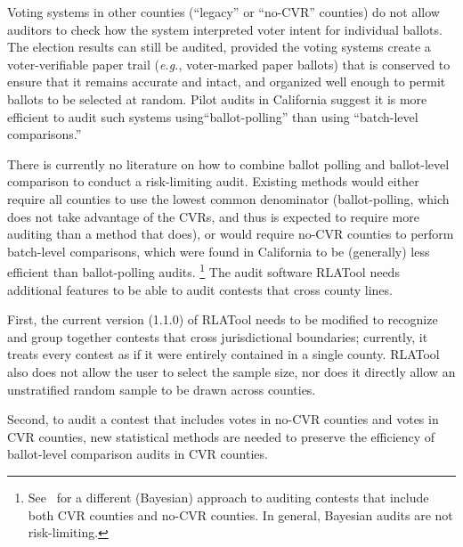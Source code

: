 \documentclass[runningheads]{llncs}
\begin{document}
Voting systems in other counties (``legacy'' or ``no-CVR'' counties) 
do not allow auditors to check how the system
interpreted voter intent for individual ballots.
The election results can still be audited, provided the voting systems
create a voter-verifiable paper trail (\emph{e.g.}, voter-marked paper ballots) that is
conserved to ensure that it remains accurate and intact, and organized well enough
to permit ballots to be selected at random.
Pilot audits in California \cite{CA_SOS_EAC} suggest it is more efficient to audit such systems
using``ballot-polling'' \cite{lindemanEtal12,lindemanStark12} than using ``batch-level comparisons.''

There is currently no literature on how to combine
ballot polling and ballot-level comparison to conduct a risk-limiting audit.
Existing methods would either require all counties to use the lowest
common denominator (ballot-polling, which does not take advantage of the CVRs,
and thus is expected to require more auditing than a method that does),
 or would require no-CVR counties to perform batch-level comparisons, which were found in
California to be (generally) less efficient than ballot-polling audits.%
\footnote{%
  See~\cite{Rivest-2018-bayesian-tabulation-audits}
  for a different (Bayesian) approach to auditing contests that include both CVR counties
  and no-CVR counties. In general, Bayesian audits are not risk-limiting.
}
The audit software RLATool needs additional features to be able to audit
contests that cross county lines.

First, the current version (1.1.0) of RLATool
needs to be modified to recognize and group together contests that cross jurisdictional
boundaries; currently, it treats every contest as if it were entirely
contained in a single county.
RLATool also does not allow the user to select the sample size, nor does
it directly allow an unstratified random sample to be drawn across counties.

Second, to audit a contest that includes votes in no-CVR counties
and votes in CVR counties, new statistical methods are needed to
preserve the efficiency of ballot-level comparison audits in CVR counties.

\end{document}
